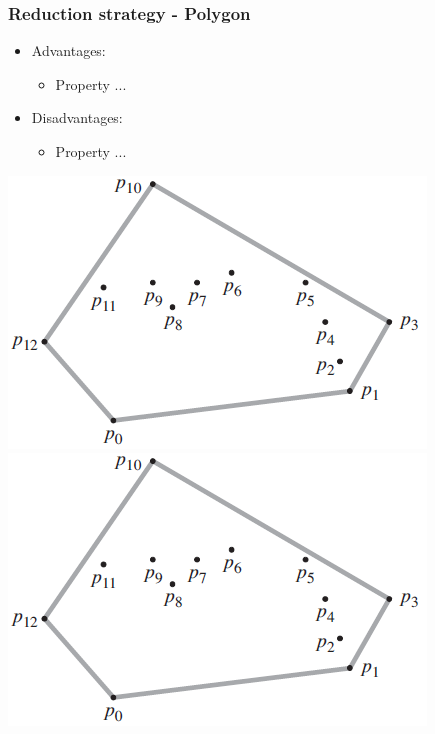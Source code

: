 \begin{frame}
\frametitle{Reduction strategy - Polygon}
\begin{multicols}{2}
	\begin{itemize}
		\item Advantages:
		\begin{itemize}
			\item Property ...
		\end{itemize}
		\item Disadvantages:
		\begin{itemize}
			\item Property ...
		\end{itemize}
	\end{itemize}
\columnbreak
	\begin{center}
		\includegraphics[scale=0.5]{graphics/convexHull-example}\\
		\includegraphics[scale=0.5]{graphics/convexHull-example}
	\end{center}
\end{multicols}
\end{frame}

